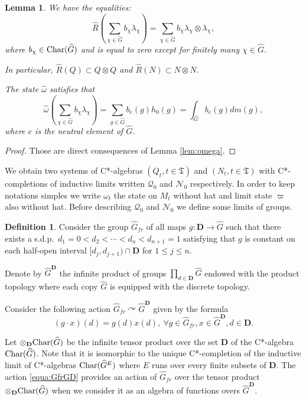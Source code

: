 \documentclass[a4paper,12pt]{amsart}
\numberwithin{equation}{section}
\newtheorem{lemma}[theo]{Lemma}
\theoremstyle{definition}
\newtheorem{definition}[theo]{Definition}
\newcommand{\act}{\curvearrowright}
\newcommand{\Ch}{\textup{Char}}
\newcommand{\D}{\mathbf D}
\newcommand{\dn}{d_1=0<d_2<\cdots<d_n<d_{n+1}=1}
\newcommand{\la}{\lambda}
\newcommand{\scrN}{\mathscr N}
\newcommand{\ot}{\otimes}\newcommand{\otmin}{\otimes_{\text{min}}}
\newcommand{\scrQ}{\mathscr Q}
\newcommand{\fT}{\mathfrak T}
\newcommand{\wh}{\widehat}
\begin{document}
\begin{lemma}\label{lem:whR}
We have the equalities:
$$
\wh R( \sum_{\chi\in\wh G} b_\chi \la_\chi)  = \sum_{\chi\in\wh G} b_\chi \la_\chi \ot \la_\chi,$$
where $b_\chi\in \Ch(\wh G)$ and is equal to zero except for finitely many $\chi\in\wh G.$

In particular, $\wh R(Q)\subset  Q\ot  Q$ and $\wh R( N)\subset  N \ot  N.$

The state $\wh \omega$ satisfies that $$\wh\omega( \sum_{\chi\in\wh G} b_\chi \la_\chi) = \sum_{g\in \wh G} b_e(g) h_0(g)= \int_{\wh G} b_e(g) d m(g),$$
where $e$ is the neutral element of $\wh G$.
\end{lemma}

\begin{proof}
Those are direct consequences of Lemma \ref{lem:omega}.
\end{proof}
%
We obtain two systems of C*-algebras $(Q_t,t\in \fT)$ and $(N_t,t\in\fT)$ with C*-completions of inductive limits written $\scrQ_0$ and $\scrN_0$ respectively. 
In order to keep notations simples we write $\omega_t$ the state on $M_t$ without hat and limit state $\varpi$ also without hat.
Before describing $\scrQ_0$ and $\scrN_0$ we define some limits of groups.

\begin{definition}
Consider the group $\wh G_{fr}$ of all maps $g:\D\to \wh G$ such that there exists a s.d.p.~$\dn$ satisfying that $g$ is constant on each half-open interval $[d_j,d_{j+1})\cap \D$ for $1\leq j\leq n.$

Denote by ${\wh G}^\D$ the infinite product of groups $\prod_{d\in\D} \wh G$ endowed with the product topology where each copy $\wh G$ is equipped with the discrete topology.
\end{definition}

Consider the following action $\wh G_{fr}\act{\wh G}^\D$ given by the formula
\begin{equation}\label{equa:GfrGD} (g\cdot x) (d) = g(d)x(d),\ \forall  g\in \wh G_{fr}, x\in {\wh G}^\D, d\in \D.\end{equation}

Let $\ot_\D \Ch(\wh G)$ be the infinite tensor product over the set $\D$ of the C*-algebra $\Ch(\wh G)$. 
Note that it is isomorphic to the unique C*-completion of the inductive limit of C*-algebras $\Ch({\wh G}^E)$ where $E$ runs over every finite subsets of $\D.$ 
The action \eqref{equa:GfrGD} provides an action of $\wh G_{fr}$ over the tensor product $\ot_\D \Ch( \wh G) $ when we consider it as an algebra of functions overs ${\wh G}^\D.$
\end{document}
